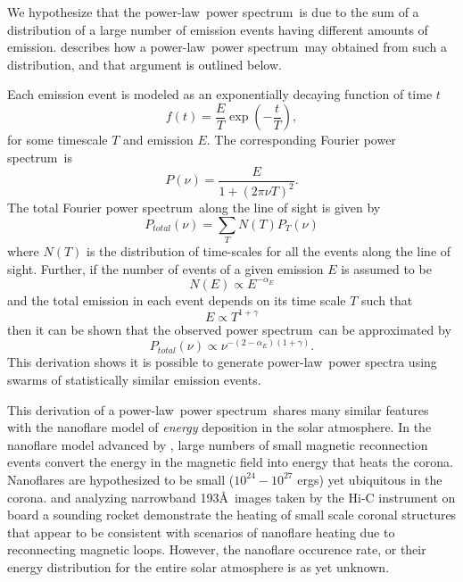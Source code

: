 \documentclass{aastex}
\newcommand{\PS}{power spectrum}
\newcommand{\PL}{power-law}
\newcommand{\Fps}{Fourier \PS}
\begin{document}
We hypothesize that the \PL\ \PS\ is due to the sum of a distribution
of a large number of emission events having different amounts of
emission. \cite{2011soca.book.....A} describes how a \PL\ \PS\ may
obtained from such a distribution, and that argument is outlined
below.

Each emission event is modeled as an exponentially decaying function
of time $t$
\begin{equation}
\label{eqn:expdecay}
f(t) = \frac{E}{T}\exp\left(-\frac{t}{T}\right),
\end{equation}
for some timescale $T$ and emission $E$.  The corresponding \Fps\ is
\begin{equation}
\label{eqn:ftexpdecay}
P(\nu) = \frac{E}{1 + (2\pi \nu T)^{2}}.
\end{equation}
The total \Fps\ along the line of sight is given by
\begin{equation}
\label{eqn:sumftexpdecay}
P_{total}(\nu) = \sum_{T}N(T)P_{T}(\nu)
\end{equation}
where $N(T)$ is the distribution of time-scales for all the events
along the line of sight.  Further, if the number of events of a given
emission $E$ is assumed to be
\begin{equation}
\label{eqn:energydistrib}
N(E) \propto E^{-\alpha_{E}}
\end{equation}
and the total emission in each event depends on its time scale $T$
such that
\begin{equation}
\label{eqn:energytime}
E \propto T^{1+\gamma}
\end{equation}
then it can be shown that the observed \PS\ can be
approximated by
\begin{equation}
\label{eqn:finalfps}
P_{total}(\nu) \propto \nu^{-(2-\alpha_{E})(1+\gamma)}.
\end{equation}
This derivation shows it is possible to generate \PL\ power spectra
using swarms of statistically similar emission events.  

This derivation of a \PL\ \PS\ shares many similar features with the
nanoflare model of {\it energy} deposition in the solar atmosphere. In
the nanoflare model advanced by \cite{1988ApJ...330..474P}, large
numbers of small magnetic reconnection events convert the energy in
the magnetic field into energy that heats the corona.  Nanoflares are
hypothesized to be small ($10^{24}-10^{27}$ ergs) yet ubiquitous in
the corona.  \cite{2013ApJ...771...21W} and \cite{2013ApJ...770L...1T}
analyzing narrowband 193\AA\ images taken by the Hi-C instrument on
board a sounding rocket demonstrate the heating of small scale coronal
structures that appear to be consistent with scenarios of nanoflare
heating due to reconnecting magnetic loops.  However, the nanoflare
occurence rate, or their energy distribution for the entire solar
atmosphere is as yet unknown.
\end{document}
